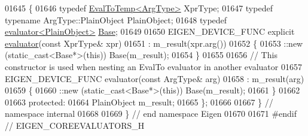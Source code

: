 \begin{DoxyCode}
01645 \{
01646   \textcolor{keyword}{typedef} \hyperlink{class_eigen_1_1internal_1_1_eval_to_temp}{EvalToTemp<ArgType>}                   XprType;
01647   \textcolor{keyword}{typedef} \textcolor{keyword}{typename} ArgType::PlainObject         PlainObject;
01648   \textcolor{keyword}{typedef} \hyperlink{struct_eigen_1_1internal_1_1evaluator}{evaluator<PlainObject>} \hyperlink{struct_eigen_1_1internal_1_1evaluator}{Base};
01649   
01650   EIGEN\_DEVICE\_FUNC \textcolor{keyword}{explicit} \hyperlink{struct_eigen_1_1internal_1_1evaluator}{evaluator}(\textcolor{keyword}{const} XprType& xpr)
01651     : m\_result(xpr.arg())
01652   \{
01653     ::new (static\_cast<Base*>(\textcolor{keyword}{this})) Base(m\_result);
01654   \}
01655 
01656   \textcolor{comment}{// This constructor is used when nesting an EvalTo evaluator in another evaluator}
01657   EIGEN\_DEVICE\_FUNC evaluator(\textcolor{keyword}{const} ArgType& arg)
01658     : m\_result(arg)
01659   \{
01660     ::new (static\_cast<Base*>(\textcolor{keyword}{this})) Base(m\_result);
01661   \}
01662 
01663 \textcolor{keyword}{protected}:
01664   PlainObject m\_result;
01665 \};
01666 
01667 \} \textcolor{comment}{// namespace internal}
01668 
01669 \} \textcolor{comment}{// end namespace Eigen}
01670 
01671 \textcolor{preprocessor}{#endif // EIGEN\_COREEVALUATORS\_H}
\end{DoxyCode}
